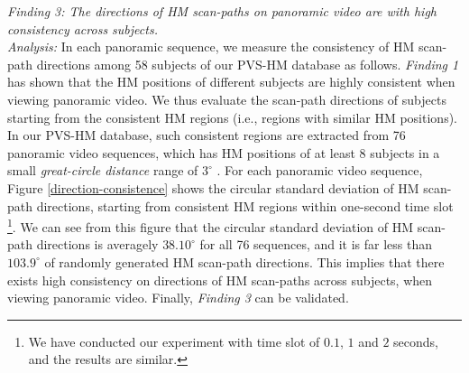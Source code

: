 \documentclass[10pt,journal,compsoc]{IEEEtran}
\begin{document}
\emph{Finding 3: The directions of HM scan-paths on panoramic video are with high consistency across subjects.}
\\ \textit{Analysis:} In each panoramic sequence, we measure the consistency of HM scan-path directions among 58 subjects of our PVS-HM database as follows.
\textit{Finding 1} has shown that the HM positions of different subjects are highly consistent when viewing panoramic video.
We thus evaluate the scan-path directions of subjects starting from the consistent HM regions (i.e., regions with similar HM positions).
In our PVS-HM database, such consistent regions are extracted from 76 panoramic video sequences, which has HM positions of at least 8 subjects in a small \textit{great-circle distance} range of $3^{\circ}$ \cite{matin1974saccadic}.
For each panoramic video sequence, Figure \ref{direction-consistence} shows the circular standard deviation \cite{frederic2010mean} of HM scan-path directions, starting from consistent HM regions within one-second time slot \footnote{We have conducted our experiment with time slot of $0.1$, $1$ and $2$ seconds, and the results are similar.}.
We can see from this figure that the circular standard deviation of HM scan-path directions is averagely $38.10^{\circ}$ for all 76 sequences, and it is far less than $103.9^{\circ}$ of randomly generated HM scan-path directions.
This implies that there exists high consistency on directions of HM scan-paths across subjects, when viewing panoramic video.
Finally, \textit{Finding 3} can be validated.
\end{document}
